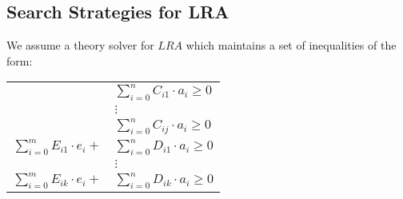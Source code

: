 \documentclass{llncs}
\newtheorem{thm}{Theorem}
\begin{document}
\begin{comment}
We can claim the following theorem, by noting that the property of term being disequality-compatible gives us the ability to construct a well formed model for quantified formulas.

\begin{thm}
Given a DPLL(T) state $M \parallel F$ where all clauses $F$ are satisfied, say for all asserted formula $(\psi :) \forall \bar{x}. \varphi(\bar{x} )$.
Then, if all quantified formulae $\psi \in M$ are disequality-compatible, then

\end{thm}
\begin{proof}

\end{proof}

The following example shows use of this theorem:

{\bf Example 6}
Say we wish to determine the satisfiability of the set of formulas $S = \{ a \neq b, f( a ) \neq d, (\psi :) \forall \bar{x}. (x = b \Rightarrow f( x ) = d) \}$.
After applying Unit propagation, applying Decide for $\bot^{\neg \psi}$, applying Counterexample $\forall$-Inst, after unit propagation we arrive in the DPLL(T) state $a \neq b, f( a ) \neq d, \neg( \bot^{\neg \psi} )^d, e = b, f( e ) \neq d \parallel S$.
Note that $f( e )$ is disequality combatible since $e \neq a$.
Therefore, by our theorem, $S$ is a satisifiable. \\
\end{comment}

\subsection{Search Strategies for LRA}

We assume a theory solver for $LRA$ which maintains a set of inequalities of the form:

\begin{tabular}{rl}
 & $\displaystyle\sum\limits_{i=0}^n C_{i1} \cdot a_i \geq 0$ \\
 & $\vdots$ \\
 & $\displaystyle\sum\limits_{i=0}^n C_{ij} \cdot a_i \geq 0$ \\
 $\displaystyle\sum\limits_{i=0}^m E_{i1} \cdot e_i +$ & $\displaystyle\sum\limits_{i=0}^n D_{i1} \cdot a_i \geq 0$ \\
 & $\vdots$ \\
 $\displaystyle\sum\limits_{i=0}^m E_{ik} \cdot e_i +$ & $\displaystyle\sum\limits_{i=0}^n D_{ik} \cdot a_i \geq 0$ \\
 \end{tabular} \\
\end{document}
